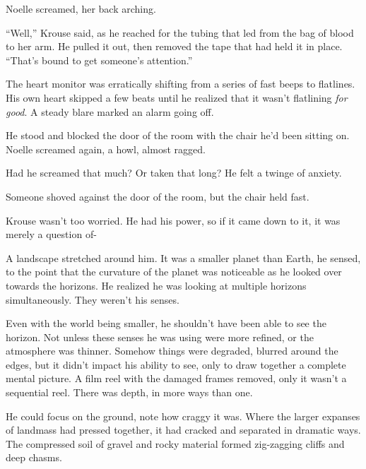 





Noelle screamed, her back arching.



``Well,'' Krouse said, as he reached for the tubing that led from the bag of blood to her arm.  He pulled it out, then removed the tape that had held it in place. ``That's bound to get someone's attention.''



The heart monitor was erratically shifting from a series of fast beeps to flatlines.  His own heart skipped a few beats until he realized that it wasn't flatlining \emph{for good}.  A steady blare marked an alarm going off.



He stood and blocked the door of the room with the chair he'd been sitting on.  Noelle screamed again, a howl, almost ragged.



Had he screamed that much?  Or taken that long?  He felt a twinge of anxiety.



Someone shoved against the door of the room, but the chair held fast.



Krouse wasn't too worried.  He had his power, so if it came down to it, it was merely a question of-



A landscape stretched around him.  It was a smaller planet than Earth, he sensed, to the point that the curvature of the planet was noticeable as he looked over towards the horizons.  He realized he was looking at multiple horizons simultaneously.  They weren't his senses.



Even with the world being smaller, he shouldn't have been able to see the horizon.  Not unless these senses he was using were more refined, or the atmosphere was thinner.  Somehow things were degraded, blurred around the edges, but it didn't impact his ability to see, only to draw together a complete mental picture.  A film reel with the damaged frames removed, only it wasn't a sequential reel.  There was depth, in more ways than one.



He could focus on the ground, note how craggy it was.  Where the larger expanses of landmass had pressed together, it had cracked and separated in dramatic ways.  The compressed soil of gravel and rocky material formed zig-zagging cliffs and deep chasms.



